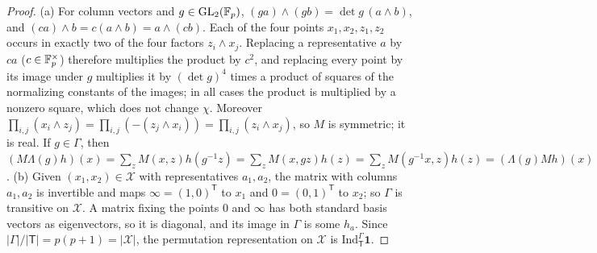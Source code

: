 \begin{proof}
(a) For column vectors and $g\in\mathrm{GL}_2(\mathbb F_p)$,
$(ga)\wedge(gb)=\det g\,(a\wedge b)$, and $(ca)\wedge b=c(a\wedge b)=a\wedge(cb)$.
Each of the four points $x_1,x_2,z_1,z_2$ occurs in exactly two of the four
factors $z_i\wedge x_j$. Replacing a representative $a$ by $ca$
($c\in\mathbb F_p^\times$) therefore multiplies the product by $c^2$, and replacing
every point by its image under $g$ multiplies it by $(\det g)^4$ times a
product of squares of the normalizing constants of the images; in all cases
the product is multiplied by a nonzero square, which does not change $\chi$.
Moreover
$\prod_{i,j}(x_i\wedge z_j)=\prod_{i,j}(-(z_j\wedge x_i))=\prod_{i,j}(z_i\wedge x_j)$,
so $M$ is symmetric; it is real. If $g\in\Gamma$, then
$(M\Lambda(g)h)(x)=\sum_zM(x,z)h(g^{-1}z)=\sum_zM(x,gz)h(z)
=\sum_zM(g^{-1}x,z)h(z)=(\Lambda(g)Mh)(x)$.
(b) Given $(x_1,x_2)\in\mathcal X$ with representatives $a_1,a_2$, the matrix
with columns $a_1,a_2$ is invertible and maps $\infty=(1,0)^{\mathsf T}$ to
$x_1$ and $0=(0,1)^{\mathsf T}$ to $x_2$; so $\Gamma$ is transitive on
$\mathcal X$. A matrix fixing the points $0$ and $\infty$ has both standard
basis vectors as eigenvectors, so it is diagonal, and its image in $\Gamma$ is
some $h_a$. Since $|\Gamma|/|\mathsf T|=p(p+1)=|\mathcal X|$, the permutation
representation on $\mathcal X$ is $\mathrm{Ind}_{\mathsf T}^\Gamma\mathbf 1$.
\end{proof}

